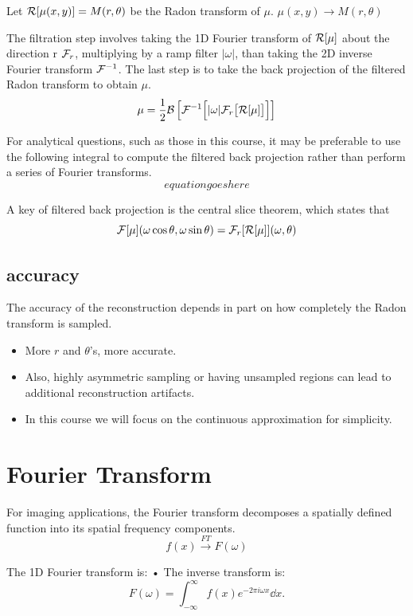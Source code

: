 \documentclass[UTF8,a4paper,11pt]{book}
\theoremstyle{mystyle}{
  \newtheorem{example}{Example}
}
\begin{document}
Let ${\cal R} [\mu(x,y) ] = M(r,\theta) $ be the Radon transform
of $\mu$. $\mu(x,y) \to M(r,\theta)$

The filtration step involves taking the 1D
Fourier transform of ${\cal R} [\mu]$ about the direction
r ${\cal F}_r$, multiplying by a ramp filter $|\omega|$, than taking
the 2D inverse Fourier transform ${\cal F}^{-1}$.
The last step is to take the back projection of
the filtered Radon transform to obtain $\mu$.
\[
\mu = \frac{1}{2}{\cal B} \left[
{\cal F}^{-1}
\Big[|\omega| {\cal F}_r \big[ {\cal R} [\mu] \big]   \Big]  
\right]
\]

For analytical questions, such as those in this
course, it may be preferable to use the
following integral to compute the filtered back
projection rather than perform a series of
Fourier transforms.
\[
equation goes here
\]

A key of filtered back projection is the central
slice theorem, which states that
\begin{equation}
{\cal F}[\mu](\omega\cos\theta,\omega\sin\theta)
= {\cal F}_r [ {\cal R }[\mu] ] (\omega,\theta)
\end{equation}

\subsection{accuracy}
The accuracy of the reconstruction depends in
part on how completely the Radon transform
is sampled.
\begin{itemize}
\item More $r$ and $\theta$'s, more accurate.
\item Also, highly asymmetric sampling or having
unsampled regions can lead to additional
reconstruction artifacts.
\item In this course we will focus on the continuous
approximation for simplicity.
\end{itemize}


\section{Fourier Transform}
For imaging applications, the Fourier
transform decomposes a spatially defined
function into its spatial frequency
components.
\[ f(x) \overset{FT}{\longrightarrow} F(\omega)\]

The 1D Fourier transform is:
• The inverse transform is:
\begin{equation}
F(\omega) = \int_{-\infty}^{\infty} f(x) e^{-2\pi i \omega x} \dd{x}.
\end{equation}
\end{document}
